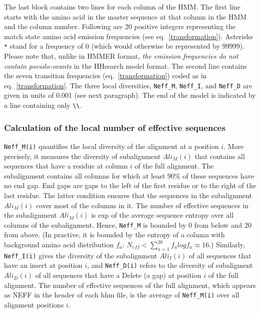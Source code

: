 \documentclass[11pt,a4paper]{article}
\begin{document}
 The last block contains two lines for each column of the HMM. The first line starts with the amino acid in the master sequence at that column in the HMM and the column number. Following are 20  positive integers representing the match state amino acid emission frequencies (see eq.\ \ref{transformation}). Asterisks \verb`*` stand for a frequency of 0 (which would otherwise be represented by 99999). Please note that, unlike in HMMER format,  \emph{the emission frequencies do not contain pseudo-counts} in the HHsearch model format. The second line contains the seven transition frequencies (eq.\ \ref{transformation}) coded as in eq.\ \ref{transformation}. The three local diversities, \verb`Neff_M`, \verb`Neff_I`, and \verb`Neff_D` are given in units of 0.001 (see next paragraph). The end of the model is indicated by a line containing only \verb`\\`.

\subsubsection*{Calculation of the local number of effective sequences}

\verb`Neff_M(i)` quantifies the local diversity of the alignment at a position $i$. More precisely, it measures the diversity of subalignment $Ali_M(i)$ that contains all sequences that have a residue at column $i$ of the full alignment. The subalignment contains all columns for which at least 90\% of these sequences have no end gap. End gaps are gaps to the left of the first residue or to the right of the last residue. The latter condition ensures that the sequences in the subalignment $Ali_M(i)$ cover most of the columns in it. The number of effective sequences in the subalignment $Ali_M(i)$ is exp of the average sequence entropy over all columns of the subalignment. Hence, \verb`Neff_M` is bounded by 0 from below and 20 from above. (In practive, it is bounded by the entropy of a column with background amino acid distribution $f_a$: $N_{eff} < \sum_{a=1}^{20} f_a log f_a \approx 16$.) Similarly, \verb`Neff_I(i)` gives the diversity of the subalignment $Ali_I(i)$ of all sequences that have an insert at position $i$, and \verb`Neff_D(i)` refers to the diversity of subaligment $Ali_D(i)$ of all sequences that have a Delete (a gap) at position $i$ of the full alignment. The number of effective sequences of the full alignment, which appears as NEFF in the header of each hhm file, is the average of \verb`Neff_M(i)` over all alignment positions $i$.
\end{document}
